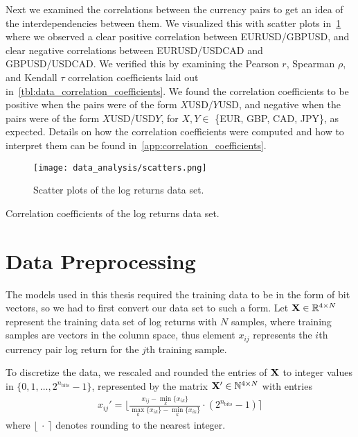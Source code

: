 Next we examined the correlations between the currency pairs to get an idea of the interdependencies between them.
We visualized this with scatter plots in~\cref{fig:scatters} where we observed a clear positive correlation between EURUSD/GBPUSD, and clear negative correlations between EURUSD/USDCAD and GBPUSD/USDCAD.
We verified this by examining the Pearson \( r \), Spearman \( \rho \), and Kendall \( \tau \) correlation coefficients laid out in~\cref{tbl:data_correlation_coefficients}.
We found the correlation coefficients to be positive when the pairs were of the form \( X \)USD/\( Y \)USD, and negative when the pairs were of the form \( X \)USD/USD\( Y \), for \( X,Y \in \) \{EUR, GBP, CAD, JPY\}, as expected.
Details on how the correlation coefficients were computed and how to interpret them can be found in~\cref{app:correlation_coefficients}.
\begin{figure}[!htb]
    \begin{center}
        \texttt{[image: data\_analysis/scatters.png]}
    \end{center}
    \caption{Scatter plots of the log returns data set.}
    \label{fig:scatters}
\end{figure}

\begin{table}[!htb]
    \centering
    \begin{adjustbox}{max width=\textwidth}
        
    \end{adjustbox}
    \caption{Correlation coefficients of the log returns data set.}
    \label{tbl:data_correlation_coefficients}
\end{table}


\section{Data Preprocessing}
The models used in this thesis required the training data to be in the form of bit vectors, so we had to first convert our data set to such a form.
Let \( \mathbf{X} \in \mathbb{R}^{4 \times N} \) represent the training data set of log returns with \( N \) samples, where training samples are vectors in the column space, thus element \( x_{ij} \) represents the \( i \)th currency pair log return for the \( j \)th training sample.

To discretize the data, we rescaled and rounded the entries of \( \mathbf{X} \) to integer values in \( \{0, 1, \dots, 2^{n_\text{bits}} - 1\} \), represented by the matrix \( \mathbf{X}' \in \mathbb{N}^{4 \times N} \) with entries
\begin{align}
    x_{ij}' = \bigg\lfloor \frac{x_{ij} - \min_k \{x_{ik}\}}{\max_k \{x_{ik}\} - \min_k \{x_{ik}\}} \cdot (2^{n_\text{bits}} - 1) \bigg\rceil
\end{align}
where \( \lfloor \ \cdot \ \rceil \) denotes rounding to the nearest integer.

